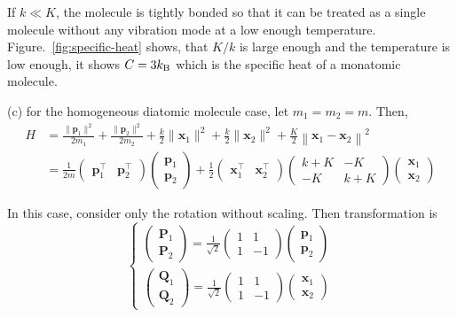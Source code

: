 \documentclass[a4paper,11pt]{article}
\begin{document}
If $k \ll K$, the molecule is tightly bonded so that it can be treated as a single molecule without any vibration mode at a low enough temperature. Figure.~\ref{fig:specific-heat} shows, that $K/k$ is large enough and the temperature is low enough, it shows $C=3k_{\mathrm{B}}$ which is the specific heat of a monatomic molecule.


(c) for the homogeneous diatomic molecule case, let $m_1 = m_2 = m$. Then,
\begin{align}
    H &= \frac{\|\mathbf{p}_1\|^2}{2m_1}
    + \frac{\|\mathbf{p}_2\|^2}{2m_2}
    + \frac{k}{2}\|\mathbf{x}_1\|^2
    + \frac{k}{2}\|\mathbf{x}_2\|^2
    + \frac{K}{2}\left\|\mathbf{x}_1 - \mathbf{x}_2\right\|^2 \\
    &= \frac{1}{2m}\begin{pmatrix}\mathbf p_1^\top & \mathbf p_2^\top\end{pmatrix}
    \begin{pmatrix}\mathbf p_1 \\ \mathbf p_2\end{pmatrix}
    + \frac{1}{2}\begin{pmatrix}\mathbf x_1^\top & \mathbf x_2^\top\end{pmatrix}
    \begin{pmatrix}k + K& -K \\ -K & k + K\end{pmatrix}
    \begin{pmatrix}\mathbf x_1 \\ \mathbf x_2\end{pmatrix}
\end{align}

In this case, consider only the rotation without scaling. Then transformation is
\begin{equation}
    \begin{cases}
        \begin{pmatrix}\mathbf P_1 \\ \mathbf P_2\end{pmatrix}
        = \frac{1}{\sqrt{2}}\begin{pmatrix}1 & 1 \\ 1 & -1 \end{pmatrix}
        \begin{pmatrix}\mathbf p_1 \\ \mathbf p_2\end{pmatrix}\\
        \begin{pmatrix}\mathbf Q_1 \\ \mathbf Q_2\end{pmatrix}
        = \frac{1}{\sqrt{2}}\begin{pmatrix}1 & 1 \\ 1 & -1 \end{pmatrix}
        \begin{pmatrix}\mathbf x_1 \\ \mathbf x_2\end{pmatrix}
    \end{cases}
\end{equation}
\end{document}

